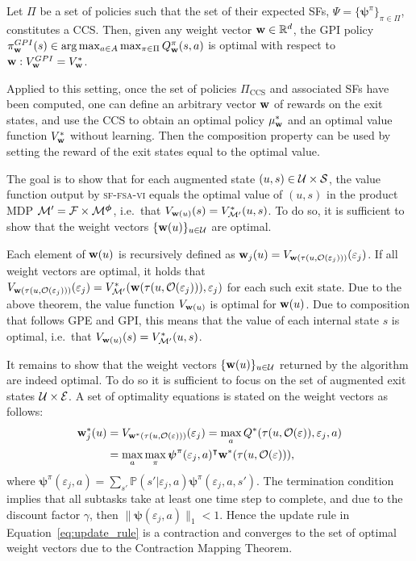\begin{theorem}
Let $\Pi$ be a set of policies such that the set of their expected SFs, $\Psi=\{\boldsymbol{\psi}^\pi\}_{\pi\in\Pi}$, constitutes a CCS. Then, given any weight vector $\mathbf{w}\in\mathbb{R}^d$, the GPI policy $\pi_{\mathbf{w}}^{GPI}(s) \in \arg \max_{a\in A} \max_{\pi\in\Pi} Q_{\mathbf{w}}^\pi(s,a)$ is
optimal with respect to ${\mathbf{w}: V_{\mathbf{w}}^{GPI} = V_{\mathbf{w}}^*}$.
\end{theorem}

\noindent
Applied to this setting, once the set of policies $\Pi_\text{CCS}$ and associated SFs have been computed, one can define an arbitrary vector $\mathbf{w}$ of rewards on the exit states, and use the CCS to obtain an optimal policy $\mu_{\mathbf{w}}^*$ and an optimal value function $V_{\mathbf{w}}^*$ without learning. Then the composition property can be used by setting the reward of the exit states equal to the optimal value.

The goal is to show that for each augmented state ${(u,s)\in\mathcal{U}\times\mathcal{S}}$, the value function output by \textsc{sf-fsa-vi} equals the optimal value of $(u,s)$ in the product MDP $\mathcal{M}'=\mathcal{F}\times\mathcal{M}^{\boldsymbol{\phi}}$, i.e.~that $V_{\mathbf{w}(u)}(s)=V_{\mathcal{M}'}^*(u,s)$. To do so, it is sufficient to show that the weight vectors $\{\mathbf{w}(u)\}_{u\in\mathcal{U}}$ are optimal.

Each element of $\mathbf{w}(u)$ is recursively defined as $\mathbf{w}_j(u)=V_{\mathbf{w}(\tau(u,\mathcal{O}(\varepsilon_j)))}(\varepsilon_j)$. If all weight vectors are optimal, it holds that $V_{\mathbf{w}(\tau(u,\mathcal{O}(\varepsilon_j)))}(\varepsilon_j)=V_{\mathcal{M}'}^*(\mathbf{w}(\tau(u,\mathcal{O}(\varepsilon_j))),\varepsilon_j)$ for each such exit state. Due to the above theorem, the value function $V_{\mathbf{w}(u)}$ is optimal for $\mathbf{w}(u)$. Due to composition that follows GPE and GPI, this means that the value of each internal state $s$ is optimal, i.e.~that $V_{\mathbf{w}(u)}(s)=V_{\mathcal{M}'}^*(u,s)$.

It remains to show that the weight vectors $\{\mathbf{w}(u)\}_{u\in\mathcal{U}}$ returned by the algorithm are indeed optimal. To do so it is sufficient to focus on the set of augmented exit states $\mathcal{U}\times\mathcal{E}$. A set of optimality equations is stated on the weight vectors as follows:
\begin{align*}
\mathbf{w}_j^*(u) &= V_{\mathbf{w}^*(\tau(u,\mathcal{O}(\varepsilon)))}(\varepsilon_j)= \max_a Q^*(\tau(u,\mathcal{O}(\varepsilon)),\varepsilon_j,a)\\
 &= \max_a\max_\pi {\boldsymbol{\psi}}^\pi(\varepsilon_j,a)^\intercal \mathbf{w}^*(\tau(u,\mathcal{O}(\varepsilon))),
\end{align*}
where ${\boldsymbol{\psi}}^\pi(\varepsilon_j,a)=\sum_{s'}\mathbb{P}(s'|\varepsilon_j,a)\boldsymbol{\psi}^\pi(\varepsilon_j,a,s')$. The termination condition implies that all subtasks take at least one time step to complete, and due to the discount factor $\gamma$, then $\lVert\boldsymbol{\psi}(\varepsilon_j,a)\rVert_1<1$. Hence the update rule in Equation~\eqref{eq:update_rule} is a contraction and converges to the set of optimal weight vectors due to the Contraction Mapping Theorem.

